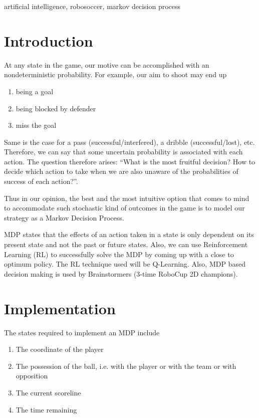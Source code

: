 \documentclass[conference,letterpaper]{IEEEtran}
\begin{document}
\begin{keywords}
artificial intelligence, robosoccer, markov decision process
\end{keywords}


\section{\textbf{Introduction}}

At any state in the game, our motive can be accomplished with an nondeterministic probability. For example, our aim to shoot may end up

\begin{enumerate}
\item being a goal
\item being blocked by defender
\item miss the goal
\end{enumerate}

Same is the case for a pass (successful/interfered), a dribble (successful/lost), etc. Therefore, we can say that some uncertain probability is associated with each action. The question therefore arises: “What is the most fruitful decision? How to decide which action to take when we are also unaware of the probabilities of success of each action?”.

Thus in our opinion, the best and the most intuitive option that comes to mind to accommodate such stochastic kind of outcomes in the game is to model our strategy as a Markov Decision Process\cite{puterman2009markov}.

MDP states that the effects of an action taken in a state is only dependent on its present state and not the past or future states. Also, we can use Reinforcement Learning (RL) to successfully solve the MDP by coming up with a close to optimum policy. The RL technique used will be Q-Learning\cite{duan2007application}. Also, MDP based decision making is used by Brainstormers\cite{riedmiller2005brainstormers}\cite{brainstormers} (3-time RoboCup 2D champions).

\section{\textbf{Implementation}}
The states required to implement an MDP include 
\begin{enumerate}
\item The coordinate of the player
\item The possession of the ball, i.e. with the player or with the team or with opposition
\item The current scoreline
\item The time remaining
\end{enumerate}
\end{document}
